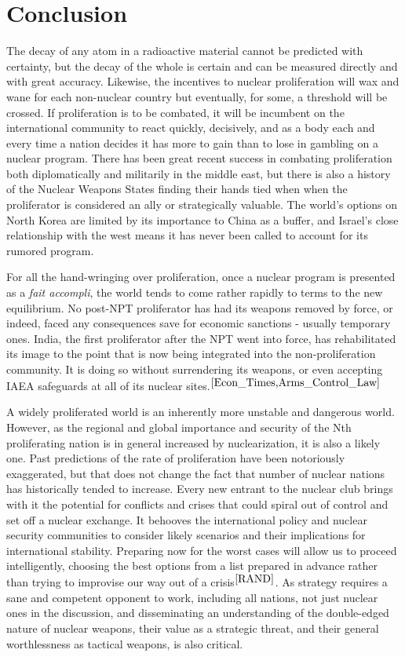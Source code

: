\documentclass[journal]{IEEEtran}
\begin{document}
\section{Conclusion}
The decay of any atom in a radioactive material cannot be predicted with certainty, but the decay of the whole is certain and can be measured directly and with great accuracy.  Likewise, the incentives to nuclear proliferation will wax and wane for each non-nuclear country but eventually, for some, a threshold will be crossed.  If proliferation is to be combated, it will be incumbent on the international community to react quickly, decisively, and as a body each and every time a nation decides it has more to gain than to lose in gambling on a nuclear program.  There has been great recent success in combating proliferation both diplomatically and militarily in the middle east, but there is also a history of the Nuclear Weapons States finding their hands tied when when the proliferator is considered an ally or strategically valuable.  The world's options on North Korea are limited by its importance to China as a buffer, and Israel's close relationship with the west means it has never been called to account for its rumored program.\par
For all the hand-wringing over proliferation, once a nuclear program is presented as a \textit{fait accompli}, the world tends to come rather rapidly to terms to the new equilibrium.  No post-NPT proliferator has had its weapons removed by force, or indeed, faced any consequences save for economic sanctions - usually temporary ones.  India, the first proliferator after the NPT went into force, has rehabilitated its image to the point that is now being integrated into the non-proliferation community.  It is doing so without surrendering its weapons, or even accepting IAEA safeguards at all of its nuclear sites.$^{\cite{Econ_Times,Arms_Control_Law}}$\par
A widely proliferated world is an inherently more unstable and dangerous world.  However, as the regional and global importance and security of the Nth proliferating nation is in general increased by nuclearization, it is also a likely one.  Past predictions of the rate of proliferation have been notoriously exaggerated, but that does not change the fact that number of nuclear nations has historically tended to increase.  Every new entrant to the nuclear club brings with it the potential for conflicts and crises that could spiral out of control and set off a nuclear exchange.  It behooves the international policy and nuclear security communities to consider likely scenarios and their implications for international stability.  Preparing now for the worst cases will allow us to proceed intelligently, choosing the best options from a list prepared in advance rather than trying to improvise our way out of a crisis$^{\cite{RAND}}$.  As strategy requires a sane and competent opponent to work, including all nations, not just nuclear ones in the discussion, and disseminating an understanding of the double-edged nature of nuclear weapons, their value as a strategic threat, and their general worthlessness as tactical weapons, is also critical.\par
\end{document}
